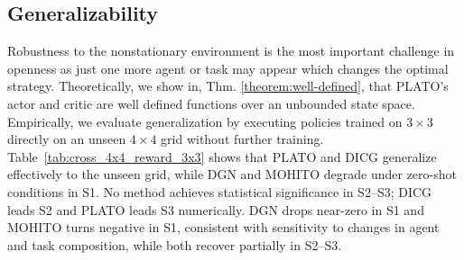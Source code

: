 \subsection{Generalizability}\label{sub:generalizability}
Robustness to the nonstationary environment is the most important challenge in openness as just one more agent or task may appear which changes the optimal strategy. Theoretically, we show in, Thm. \ref{theorem:well-defined}, that PLATO's actor and critic are well defined functions over an unbounded state space. Empirically, we evaluate generalization by executing policies trained on $3\times 3$ directly on an unseen $4\times 4$ grid without further training. Table~\ref{tab:cross_4x4_reward_3x3} shows that PLATO and DICG generalize effectively to the unseen grid, while DGN and MOHITO degrade under zero-shot conditions in S1. No method achieves statistical significance in S2--S3; DICG leads S2 and PLATO leads S3 numerically. DGN drops near-zero in S1 and MOHITO turns negative in S1, consistent with sensitivity to changes in agent and task composition, while both recover partially in S2--S3.

 
